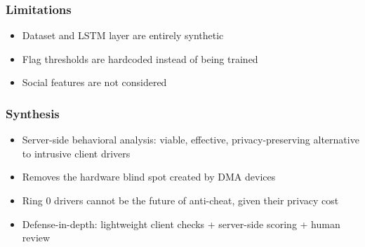 \begin{frame}
	\frametitle{Limitations}
	\begin{itemize}
		\item Dataset and LSTM layer are entirely synthetic
		\item Flag thresholds are hardcoded instead of being trained
		\item Social features are not considered
	\end{itemize}
\end{frame}

\begin{frame}
	\frametitle{Synthesis}
	\begin{itemize}
		\item Server-side behavioral analysis: viable, effective, privacy-preserving alternative to intrusive client drivers
		\item Removes the hardware blind spot created by DMA devices
		\item Ring 0 drivers cannot be the future of anti-cheat, given their privacy cost
		\item[$\Rightarrow$] Defense-in-depth: lightweight client checks + server-side scoring + human review
	\end{itemize}
\end{frame}

